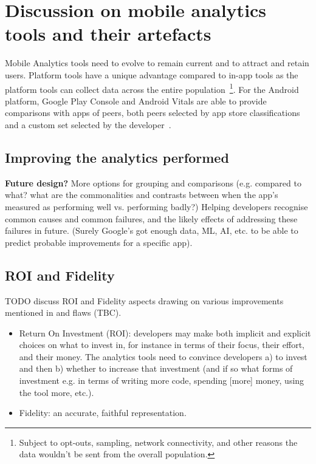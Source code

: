 \section{Discussion on mobile analytics tools and their artefacts}
Mobile Analytics tools need to evolve to remain current and to attract and retain users. Platform tools have a unique advantage compared to in-app tools as the platform tools can collect data across the entire population~\footnote{Subject to opt-outs, sampling, network connectivity, and other reasons the data wouldn't be sent from the overall population.}. For the Android platform, Google Play Console and Android Vitals are able to provide comparisons with apps of peers, both peers selected by app store classifications~\citep{androiddevelopersblog2021_gpc_powers_better_strategic_decisions_etc} and a custom set selected by the developer~\citep{play_console_help_compare_your_apps_android_vitals_and_ratings_with_peer_groups}. 

\subsection{Improving the analytics performed}
\textbf{Future design?} More options for grouping and comparisons (e.g. compared to what? what are the commonalities and contrasts between when the app's measured as performing well vs. performing badly?) Helping developers recognise common causes and common failures, and the likely effects of addressing these failures in future. (Surely Google's got enough data, ML, AI, etc. to be able to predict probable improvements for a specific app).

\subsection{ROI and Fidelity}
TODO discuss ROI and Fidelity aspects drawing on various improvements mentioned in  and flaws (TBC).

\begin{itemize}
    \item Return On Investment (ROI): developers may make both implicit and explicit choices on what to invest in, for instance in terms of their focus, their effort, and their money. The analytics tools need to convince developers a) to invest and then b) whether to increase that investment (and if so what forms of investment e.g. in terms of writing more code, spending [more] money, using the tool more, etc.).
    \item Fidelity: an accurate, faithful representation.
\end{itemize}

